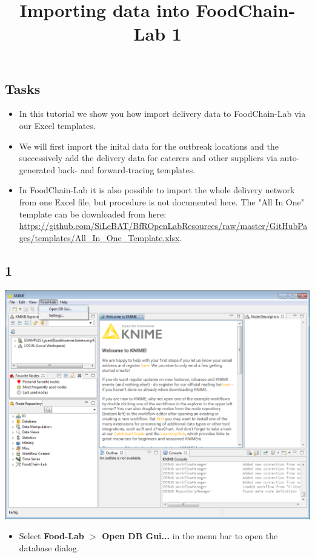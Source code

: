\documentclass{beamer}
\title{Importing data into FoodChain-Lab 1}
\date{}
\begin{document}
\maketitle

\section{ }

\subsection{Tasks}
\begin{frame}
	\begin{itemize}
		\item In this tutorial we show you how import delivery data to FoodChain-Lab via our Excel templates.
		\item We will first import the inital data for the outbreak locations and the successively add the delivery data for caterers and other suppliers via auto-generated back- and forward-tracing templates.
		\item In FoodChain-Lab it is also possible to import the whole delivery network from one Excel file, but procedure is not documented here. The "All In One" template can be downloaded from here: \url{https://github.com/SiLeBAT/BfROpenLabResources/raw/master/GitHubPages/templates/All_In_One_Template.xlsx}.
	\end{itemize}
\end{frame}
 
\subsection{1}
\begin{frame}
	\begin{center}
  		\includegraphics[height=0.6\textheight]{1.png}
	\end{center}
	\begin{itemize}
		\item Select \textbf{Food-Lab $>$ Open DB Gui...} in the menu bar to open the database dialog.
	\end{itemize}
\end{frame}
\end{document}
